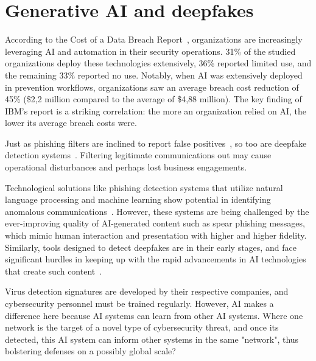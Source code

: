 \section{Generative AI and deepfakes}
\begin{comment}
\end{comment}

According to the Cost of a Data Breach Report~\citep{ibm_Cost_Data_Breach_Report_2024}, organizations are increasingly leveraging AI and automation in their security operations. 31\% of the studied organizations deploy these technologies extensively, 36\% reported limited use, and the remaining 33\% reported no use. Notably, when AI was extensively deployed in prevention workflows, organizations saw an average breach cost reduction of 45\% (\$2,2 million compared to the average of \$4,88 million). The key finding of IBM's report is a striking correlation: the more an organization relied on AI, the lower its average breach costs were.

Just as phishing filters are inclined to report false positives~\citep{fakhouri_AI_Driven_Solutions_SE_Attacks_2024}, so too are deepfake detection systems~\citep{mirsky_Creation_Detection_Deepfakes_2021}. Filtering legitimate communications out may cause operational disturbances and perhaps lost business engagements.

Technological solutions like phishing detection systems that utilize natural language processing and machine learning show potential in identifying anomalous communications~\citep{basit_Comprehensive_Survey_AI_Phishing_Detection_2021}. However, these systems are being challenged by the ever-improving quality of AI-generated content such as spear phishing messages, which mimic human interaction and presentation with higher and higher fidelity. Similarly, tools designed to detect deepfakes are in their early stages, and face significant hurdles in keeping up with the rapid advancements in AI technologies that create such content~\citep{mirsky_Creation_Detection_Deepfakes_2021}.




Virus detection signatures are developed by their respective companies, and cybersecurity personnel must be trained regularly. However, AI makes a difference here because AI systems can learn from other AI systems. Where one network is the target of a novel type of cybersecurity threat, and once its detected, this AI system can inform other systems in the same "network", thus bolstering defenses on a possibly global scale?

